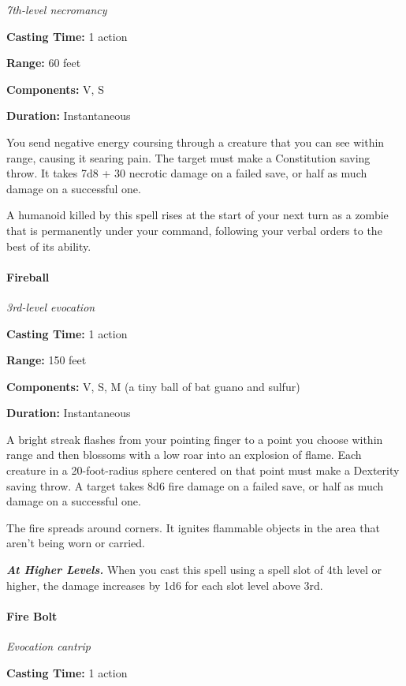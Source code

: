 \documentclass[
]{article}
\begin{document}
\emph{7th-level necromancy}

\textbf{Casting Time:} 1 action

\textbf{Range:} 60 feet

\textbf{Components:} V, S

\textbf{Duration:} Instantaneous

You send negative energy coursing through a creature that you can see
within range, causing it searing pain. The target must make a
Constitution saving throw. It takes 7d8 + 30 necrotic damage on a failed
save, or half as much damage on a successful one.

A humanoid killed by this spell rises at the start of your next turn as
a zombie that is permanently under your command, following your verbal
orders to the best of its ability.

\hypertarget{fireball}{%
\paragraph{Fireball}\label{fireball}}

\emph{3rd-level evocation}

\textbf{Casting Time:} 1 action

\textbf{Range:} 150 feet

\textbf{Components:} V, S, M (a tiny ball of bat guano and sulfur)

\textbf{Duration:} Instantaneous

A bright streak flashes from your pointing finger to a point you choose
within range and then blossoms with a low roar into an explosion of
flame. Each creature in a 20-foot-radius sphere centered on that point
must make a Dexterity saving throw. A target takes 8d6 fire damage on a
failed save, or half as much damage on a successful one.

The fire spreads around corners. It ignites flammable objects in the
area that aren't being worn or carried.

\emph{\textbf{At Higher Levels.}} When you cast this spell using a spell
slot of 4th level or higher, the damage increases by 1d6 for each slot
level above 3rd.

\hypertarget{fire-bolt}{%
\paragraph{Fire Bolt}\label{fire-bolt}}

\emph{Evocation cantrip}

\textbf{Casting Time:} 1 action
\end{document}
